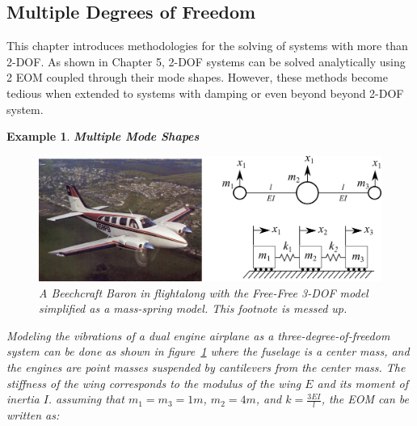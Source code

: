 \documentclass[12pt,letter]{article}
\newtheorem{ex}{Example}
\numberwithin{ex}{section} %
\newenvironment{example}{\begin{mdframed}[middlelinewidth=0.5mm]\begin{ex}\normalfont}{\end{ex}\end{mdframed}}
\numberwithin{re}{section} %
\newcommand{\rd}[1]{\textcolor[rgb]{0.75,0.00,0.00}{#1}}
\begin{document}
\subsection{Multiple Degrees of Freedom}

This chapter introduces methodologies for the solving of systems with more than 2-DOF. As shown in Chapter 5, 2-DOF systems can be solved analytically using 2 EOM coupled through their mode shapes. However, these methods become tedious when extended to systems with damping or even beyond beyond 2-DOF system.



\begin{example}
\textbf{Multiple Mode Shapes}



\begin{figure}[H]
	\centering
	\includegraphics[width=\linewidth]{../Figures/mode_shape_aiplane_example.png}
	\caption{A Beechcraft Baron in flight\protect\footnotemark[1] along with the Free-Free 3-DOF model simplified as a mass-spring model. \rd{This footnote is messed up.}}
	\label{fig:mode_shape_aiplane_example}
\end{figure}

Modeling the vibrations of a dual engine airplane as a three-degree-of-freedom system can be done as shown in figure~\ref{fig:mode_shape_aiplane_example} where the fuselage is a center mass, and the engines are point masses suspended by cantilevers from the center mass. The stiffness of the wing corresponds to the modulus of the wing $E$ and its moment of inertia $I$. assuming that $m_1=m_3=1m$, $m_2=4m$, and $k=\frac{3EI}{l}$, the EOM can be written as:


\end{example}
\end{document}
